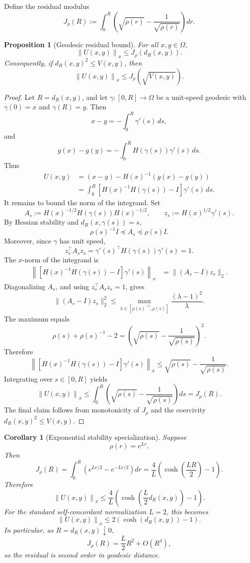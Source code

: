 \documentclass[11pt]{article}
\newtheorem{proposition}{Proposition}
\newtheorem{corollary}{Corollary}
\newcommand{\norm}[1]{\left\lVert #1\right\rVert}
\begin{document}
Define the residual modulus
\[
    J_\rho(R)
    :=
    \int_0^R
    \left(
        \sqrt{\rho(r)}-\frac{1}{\sqrt{\rho(r)}}
    \right)dr .
\]

\begin{proposition}[Geodesic residual bound]
For all $x,y\in\Omega$,
\[
    \norm{U(x,y)}_x
    \le
    J_\rho(d_R(x,y)).
\]
Consequently, if $d_R(x,y)^2\le V(x,y)$, then
\[
    \norm{U(x,y)}_x
    \le
    J_\rho\!\left(\sqrt{V(x,y)}\right).
\]
\end{proposition}

\begin{proof}
Let $R=d_R(x,y)$, and let $\gamma:[0,R]\to\Omega$ be a unit-speed geodesic
with $\gamma(0)=x$ and $\gamma(R)=y$.  Then
\[
    x-y=-\int_0^R \gamma'(s)\,ds,
\]
and
\[
    g(x)-g(y)
    =
    -\int_0^R H(\gamma(s))\gamma'(s)\,ds.
\]
Thus
\[
\begin{aligned}
    U(x,y)
    &=(x-y)-H(x)^{-1}(g(x)-g(y)) \\
    &=\int_0^R
    \left[H(x)^{-1}H(\gamma(s))-I\right]\gamma'(s)\,ds .
\end{aligned}
\]
It remains to bound the norm of the integrand.  Set
\[
    A_s:=H(x)^{-1/2}H(\gamma(s))H(x)^{-1/2},
    \qquad
    z_s:=H(x)^{1/2}\gamma'(s).
\]
By Hessian stability and $d_R(x,\gamma(s))=s$,
\[
    \rho(s)^{-1}I\preceq A_s\preceq \rho(s)I.
\]
Moreover, since $\gamma$ has unit speed,
\[
    z_s^\top A_s z_s
    =
    \gamma'(s)^\top H(\gamma(s))\gamma'(s)
    =1.
\]
The $x$-norm of the integrand is
\[
\begin{aligned}
    \left\|
    \left[H(x)^{-1}H(\gamma(s))-I\right]\gamma'(s)
    \right\|_x
    &=
    \|(A_s-I)z_s\|_2 .
\end{aligned}
\]
Diagonalizing $A_s$, and using $z_s^\top A_s z_s=1$, gives
\[
    \|(A_s-I)z_s\|_2^2
    \le
    \max_{\lambda\in[\rho(s)^{-1},\rho(s)]}
    \frac{(\lambda-1)^2}{\lambda}.
\]
The maximum equals
\[
    \rho(s)+\rho(s)^{-1}-2
    =
    \left(\sqrt{\rho(s)}-\frac{1}{\sqrt{\rho(s)}}\right)^2.
\]
Therefore
\[
    \left\|
    \left[H(x)^{-1}H(\gamma(s))-I\right]\gamma'(s)
    \right\|_x
    \le
    \sqrt{\rho(s)}-\frac{1}{\sqrt{\rho(s)}}.
\]
Integrating over $s\in[0,R]$ yields
\[
    \norm{U(x,y)}_x
    \le
    \int_0^R
    \left(
        \sqrt{\rho(s)}-\frac{1}{\sqrt{\rho(s)}}
    \right)ds
    =J_\rho(R).
\]
The final claim follows from monotonicity of $J_\rho$ and the coercivity
$d_R(x,y)^2\le V(x,y)$.
\end{proof}

\begin{corollary}[Exponential stability specialization]
Suppose
\[
    \rho(r)=e^{Lr}.
\]
Then
\[
    J_\rho(R)
    =
    \int_0^R \left(e^{Lr/2}-e^{-Lr/2}\right)dr
    =
    \frac{4}{L}\left(\cosh\left(\frac{LR}{2}\right)-1\right).
\]
Therefore
\[
    \norm{U(x,y)}_x
    \le
    \frac{4}{L}
    \left(
        \cosh\left(\frac{L}{2}d_R(x,y)\right)-1
    \right).
\]
For the standard self-concordant normalization $L=2$, this becomes
\[
    \norm{U(x,y)}_x
    \le
    2\left(\cosh(d_R(x,y))-1\right).
\]
In particular, as $R=d_R(x,y)\downarrow0$,
\[
    J_\rho(R)=\frac{L}{2}R^2+O(R^4),
\]
so the residual is second order in geodesic distance.
\end{corollary}
\end{document}
